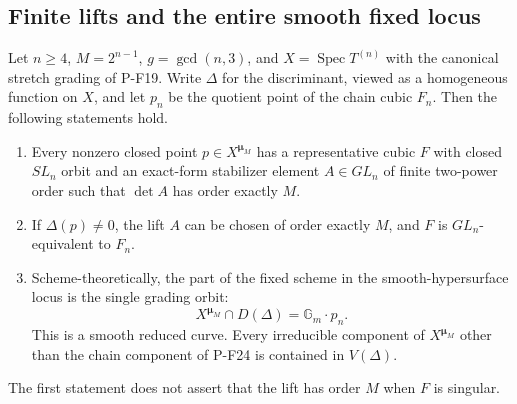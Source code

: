 \subsection{Finite lifts and the entire smooth fixed locus}

\begin{proposition}
\label{prop:finitecubiclift}
Let $n\ge4$, $M=2^{n-1}$, $g=\gcd(n,3)$, and
$X=\operatorname{Spec}T^{(n)}$ with the canonical stretch grading
of P-F19. Write $\Delta$ for the discriminant, viewed as a
homogeneous function on $X$, and let $p_n$ be the quotient point
of the chain cubic $F_n$. Then the following statements hold.

\begin{enumerate}
\item Every nonzero closed point $p\in X^{\boldsymbol\mu_M}$
has a representative cubic $F$ with closed $SL_n$ orbit and an
exact-form stabilizer element $A\in GL_n$ of finite two-power
order such that $\det A$ has order exactly $M$.
\item If $\Delta(p)\ne0$, the lift $A$ can be chosen of order
exactly $M$, and $F$ is $GL_n$-equivalent to $F_n$.
\item Scheme-theoretically, the part of the fixed scheme in
the smooth-hypersurface locus is the single grading orbit:
\[
 X^{\boldsymbol\mu_M}\cap D(\Delta)
      =\mathbb G_m\cdot p_n.
 \tag{P-F26a}
\]
This is a smooth reduced curve. Every irreducible component of
$X^{\boldsymbol\mu_M}$ other than the chain component of P-F24
is contained in $V(\Delta)$.
\end{enumerate}
The first statement does not assert that the lift has order $M$
when $F$ is singular.
\end{proposition}

